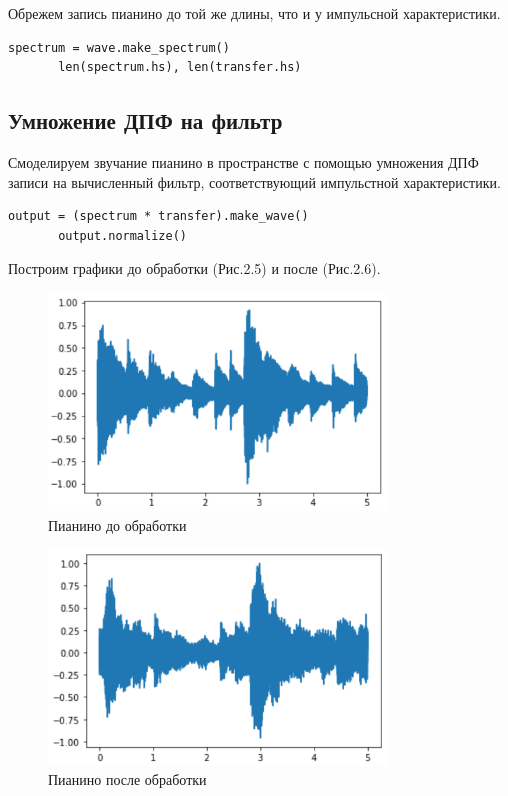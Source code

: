 \documentclass[a4paper,12pt]{report}
\begin{document}
    Обрежем запись пианино до той же длины, что и у импульсной характеристики. 
\begin{lstlisting}[caption=Сокращение длины записи пианино]
       spectrum = wave.make_spectrum()
       len(spectrum.hs), len(transfer.hs)
\end{lstlisting} 
\subsection{Умножение ДПФ на фильтр}
    Смоделируем звучание пианино в пространстве с помощью умножения ДПФ записи на вычисленный фильтр, соответствующий импульстной характеристики.
\begin{lstlisting}[caption=Умножение ДПФ на фильтр]
       output = (spectrum * transfer).make_wave()
       output.normalize()
\end{lstlisting}
    
    Построим графики до обработки (Рис.2.5) и после (Рис.2.6).
\begin{figure}[H]
        \centering
        \includegraphics[width=0.8\textwidth]{fig2-5.PNG}
        \caption{Пианино до обработки}
        \label{fig:fig2-5}
\end{figure}
\begin{figure}[H]
        \centering
        \includegraphics[width=0.8\textwidth]{fig2-6.PNG}
        \caption{Пианино после обработки}
        \label{fig:fig2-6}
\end{figure} 
\end{document}
